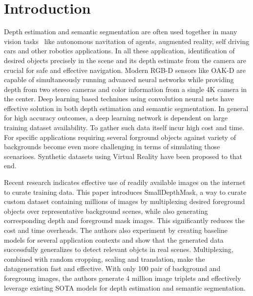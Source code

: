 \documentclass[review]{cvpr}
\begin{document}
\section{Introduction}
Depth estimation and semantic segmentation are often used together in many vision tasks~\cite{lin2018joint} like 
autonomous navitation of agents, augmented reality, self driving cars and other robotics applications. In all these application,
identification of desired objects precisely in the scene and its depth estimate from the camera are crucial for safe and effective
navigation. Modern RGB-D sensors like OAK-D are capable of simultaneously running advanced neural networks while providing depth 
from two stereo cameras and color information from a single 4K camera in the center. Deep learning based techniues using convolution
neural nets have effective solution in both depth estimation and semantic segmentation. In general for high accuracy outcomes, a
deep learning network is dependent on large training dataset availability. To gather such data itself incur high cost and time.
For specific applications requiring several forground objects against variety of backgrounds become even more challenging in terms
of simulating those scenarioes. Synthetic datasets using Virtual Reality have been proposed to that end.

Recent research indicates effective use of readily available images on the internet to curate training data.  
This paper introduces SmallDepthMask, 
a way to curate custom dataset containing millions of images by multiplexing desired foreground objects over representative background 
scenes, while also generating corresponding depth and foreground mask images. This significantly reduces the cost and time overheads.
The authors also experiment by creating baseline models for several application contexts and show that the generated data
successfully generalizes to detect relevant objcts in real scenes. Multiplexing, combined with random cropping, scaling 
and translation, make the datageneration fast and effective. With only 100 pair of background and foregroung images, the authors
generate 4 million image triplets and effectively leverage existing SOTA models for depth estimation and semantic segmentation.
\end{document}
